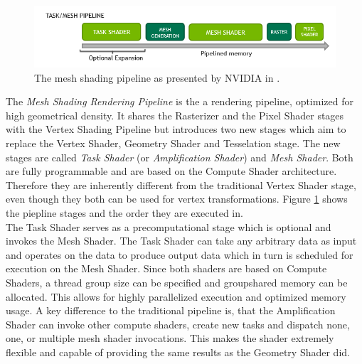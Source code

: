 \begin{figure}[h]
    \centering
    \includegraphics[width=\linewidth]{images/graphics/mesh-rendering-pipeline.png}
    \caption{The mesh shading pipeline as presented by NVIDIA in \cite[Christoph Kubisch]{Kubisch2018}.}
    \label{fig:mesh-rendering-pipeline}
\end{figure}

The \emph{Mesh Shading Rendering Pipeline} is the a rendering pipeline, optimized for high geometrical 
density. It shares the Rasterizer and the Pixel Shader stages with the Vertex Shading Pipeline but 
introduces two new stages which aim to replace the Vertex Shader, Geometry Shader and Tesselation stage.
The new stages are called \emph{Task Shader} (or \emph{Amplification Shader}) and \emph{Mesh Shader}. Both 
are fully programmable and are based on the Compute Shader architecture. Therefore they are inherently different 
from the traditional Vertex Shader stage, even though they both can be used for vertex transformations.
Figure \ref{fig:mesh-rendering-pipeline} shows the piepline stages and the order they are executed in. \\

\noindent
The Task Shader serves as a precomputational stage which is optional and invokes the Mesh Shader.
The Task Shader can take any arbitrary data as input and operates on the data to produce output data which in 
turn is scheduled for execution on the Mesh Shader. Since both shaders are based on Compute Shaders, a thread 
group size can be specified and groupshared memory can be allocated. This allows for highly parallelized execution 
and optimized memory usage. A key difference to the traditional pipeline is, that the Amplification Shader can 
invoke other compute shaders, create new tasks and dispatch none, one, or multiple mesh shader invocations. This 
makes the shader extremely flexible and capable of providing the same results as the Geometry Shader did.\\

